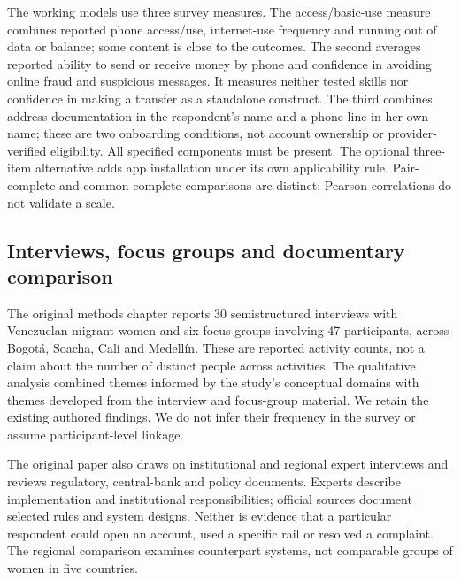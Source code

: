 The working models use three survey measures. The access/basic-use measure combines reported phone access/use, internet-use frequency and running out of data or balance; some content is close to the outcomes. The second averages reported ability to send or receive money by phone and confidence in avoiding online fraud and suspicious messages. It measures neither tested skills nor confidence in making a transfer as a standalone construct. The third combines address documentation in the respondent's name and a phone line in her own name; these are two onboarding conditions, not account ownership or provider-verified eligibility. All specified components must be present. The optional three-item alternative adds app installation under its own applicability rule. Pair-complete and common-complete comparisons are distinct; Pearson correlations do not validate a scale.

\subsection{Interviews, focus groups and documentary comparison}

The original methods chapter reports 30 semistructured interviews with Venezuelan migrant women and six focus groups involving 47 participants, across Bogotá, Soacha, Cali and Medellín. These are reported activity counts, not a claim about the number of distinct people across activities. The qualitative analysis combined themes informed by the study's conceptual domains with themes developed from the interview and focus-group material. We retain the existing authored findings. We do not infer their frequency in the survey or assume participant-level linkage.

The original paper also draws on institutional and regional expert interviews and reviews regulatory, central-bank and policy documents. Experts describe implementation and institutional responsibilities; official sources document selected rules and system designs. Neither is evidence that a particular respondent could open an account, used a specific rail or resolved a complaint. The regional comparison examines counterpart systems, not comparable groups of women in five countries.

